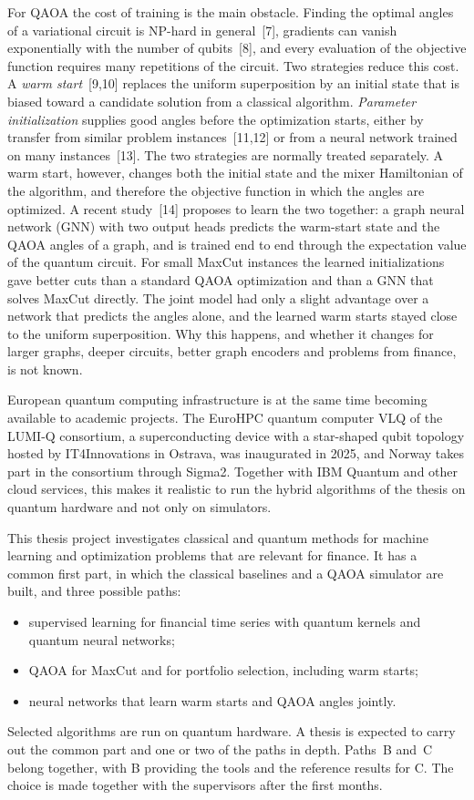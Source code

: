 \documentclass[12pt,a4paper]{article}
\begin{document}
For QAOA the cost of training is the main obstacle.  Finding the
optimal angles of a variational circuit is NP-hard in general~[7],
gradients can vanish exponentially with the number of qubits~[8], and
every evaluation of the objective function requires many repetitions
of the circuit.  Two strategies reduce this cost.  A \emph{warm
start}~[9,10] replaces the uniform superposition by an initial state
that is biased toward a candidate solution from a classical algorithm.
\emph{Parameter initialization} supplies good angles before the
optimization starts, either by transfer from similar problem
instances~[11,12] or from a neural network trained on many
instances~[13].  The two strategies are normally treated separately.
A warm start, however, changes both the initial state and the mixer
Hamiltonian of the algorithm, and therefore the objective function in
which the angles are optimized.  A recent study~[14] proposes to learn
the two together: a graph neural network (GNN) with two output heads
predicts the warm-start state and the QAOA angles of a graph, and is
trained end to end through the expectation value of the quantum
circuit.  For small MaxCut instances the learned initializations gave
better cuts than a standard QAOA optimization and than a GNN that
solves MaxCut directly.  The joint model had only a slight advantage
over a network that predicts the angles alone, and the learned warm
starts stayed close to the uniform superposition.  Why this happens,
and whether it changes for larger graphs, deeper circuits, better
graph encoders and problems from finance, is not known.

European quantum computing infrastructure is at the same time becoming
available to academic projects.  The EuroHPC quantum computer VLQ of
the LUMI-Q consortium, a superconducting device with a star-shaped
qubit topology hosted by IT4Innovations in Ostrava, was inaugurated in
2025, and Norway takes part in the consortium through Sigma2.
Together with IBM Quantum and other cloud services, this makes it
realistic to run the hybrid algorithms of the thesis on quantum
hardware and not only on simulators.

This thesis project investigates classical and quantum methods for
machine learning and optimization problems that are relevant for
finance.  It has a common first part, in which the classical baselines
and a QAOA simulator are built, and three possible paths:
\begin{itemize}
  \item[\textbf{A.}] supervised learning for financial time series
  with quantum kernels and quantum neural networks;
  \item[\textbf{B.}] QAOA for MaxCut and for portfolio selection,
  including warm starts;
  \item[\textbf{C.}] neural networks that learn warm starts and QAOA
  angles jointly.
\end{itemize}
Selected algorithms are run on quantum hardware.  A thesis is expected
to carry out the common part and one or two of the paths in depth.
Paths~B and~C belong together, with B providing the tools and the
reference results for C.  The choice is made together with the
supervisors after the first months.
\end{document}
